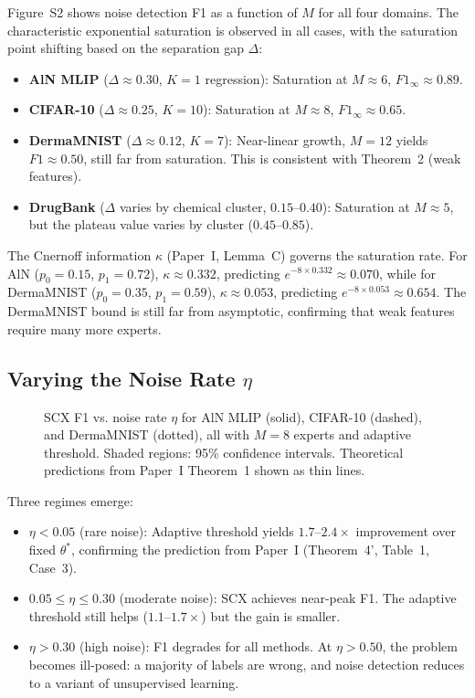 \documentclass[11pt]{article}
\begin{document}
Figure~S2 shows noise detection F1 as a function of $M$ for all four domains. The characteristic exponential saturation is observed in all cases, with the saturation point shifting based on the separation gap $\Delta$:

\begin{itemize}
	\item \textbf{AlN MLIP} ($\Delta \approx 0.30$, $K=1$ regression): Saturation at $M \approx 6$, $F1_\infty \approx 0.89$.
	\item \textbf{CIFAR-10} ($\Delta \approx 0.25$, $K=10$): Saturation at $M \approx 8$, $F1_\infty \approx 0.65$.
	\item \textbf{DermaMNIST} ($\Delta \approx 0.12$, $K=7$): Near-linear growth, $M=12$ yields $F1 \approx 0.50$, still far from saturation. This is consistent with Theorem~2 (weak features).
	\item \textbf{DrugBank} ($\Delta$ varies by chemical cluster, $0.15$--$0.40$): Saturation at $M \approx 5$, but the plateau value varies by cluster ($0.45$--$0.85$).
\end{itemize}

The Cnernoff information $\kappa$ (Paper~I, Lemma~C) governs the saturation rate. For AlN ($p_0=0.15$, $p_1=0.72$), $\kappa \approx 0.332$, predicting $e^{-8 \times 0.332} \approx 0.070$, while for DermaMNIST ($p_0=0.35$, $p_1=0.59$), $\kappa \approx 0.053$, predicting $e^{-8 \times 0.053} \approx 0.654$. The DermaMNIST bound is still far from asymptotic, confirming that weak features require many more experts.

\subsection{Varying the Noise Rate $\eta$}

\begin{figure}[h]
\centering
\caption{SCX F1 vs. noise rate $\eta$ for AlN MLIP (solid), CIFAR-10 (dashed), and DermaMNIST (dotted), all with $M=8$ experts and adaptive threshold. Shaded regions: 95\% confidence intervals. Theoretical predictions from Paper~I Theorem~1 shown as thin lines.}
\label{fig:eta_sensitivity}
\end{figure}

Three regimes emerge:
\begin{itemize}
	\item $\eta < 0.05$ (rare noise): Adaptive threshold yields $1.7$--$2.4\times$ improvement over fixed $\theta^*$, confirming the prediction from Paper~I (Theorem~4', Table~1, Case~3).
	\item $0.05 \leq \eta \leq 0.30$ (moderate noise): SCX achieves near-peak F1. The adaptive threshold still helps ($1.1$--$1.7\times$) but the gain is smaller.
	\item $\eta > 0.30$ (high noise): F1 degrades for all methods. At $\eta > 0.50$, the problem becomes ill-posed: a majority of labels are wrong, and noise detection reduces to a variant of unsupervised learning.
\end{itemize}
\end{document}
